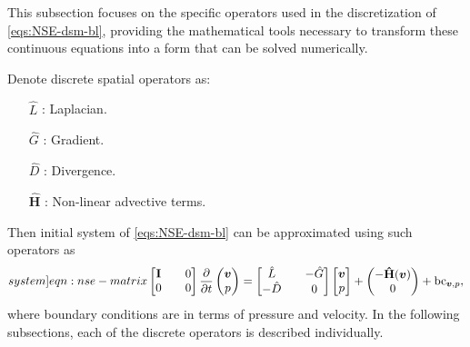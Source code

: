\documentclass{article}
\numberwithin{equation}{section}
\begin{document}
This subsection focuses on the specific operators used in the discretization of \cref{eqs:NSE-dsm-bl}, providing the mathematical tools necessary to transform these continuous equations into a form that can be solved numerically.

Denote discrete spatial operators as:
\begin{enumerate}
	\item[$\hat{L}$]:  Laplacian.
	\item[$\hat{G}$]: Gradient.
	\item[$\hat{D}$]: Divergence.
	\item[$\mathbf{\hat{H}}$]: Non-linear advective terms.
\end{enumerate}
Then initial system of \cref{eqs:NSE-dsm-bl} can be approximated using such operators as
\begin{equation}\label[system]{eqn:nse-matrix}
            \begin{bmatrix}
                  \mathbf{I} && 0 \\ 
                  0 && 0
            \end{bmatrix}
            \frac{\partial }{\partial t} 
            \begin{pmatrix}
                  \boldsymbol{v} \\ 
                  p
            \end{pmatrix}
            =
            \begin{bmatrix}
                  \hat{L} && - \hat{G} \\ 
                  -\hat{D} && 0
            \end{bmatrix}
            \begin{bmatrix}
                  \boldsymbol{v} \\
                  p
            \end{bmatrix}
            +
            \begin{pmatrix}
                  -\mathbf{\hat{H}}(\boldsymbol{v})\\
                  0
            \end{pmatrix} + \text{bc}_{\boldsymbol{v},p},
        \end{equation}
where boundary conditions are in terms of pressure and velocity. In the following subsections, each of the discrete operators is described individually. 
\end{document}
